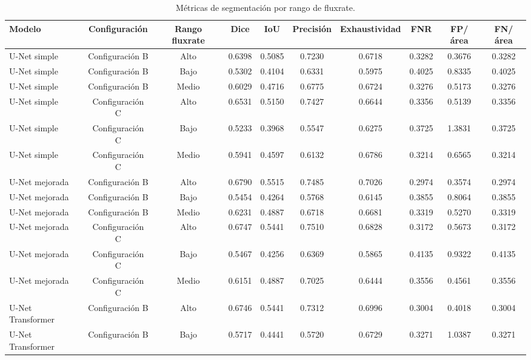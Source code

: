 \begin{table}[H]
    \centering
    \small
    \caption{Métricas de segmentación por rango de fluxrate.}
    \label{tab:metricas_por_rango_fluxrate}
    \begin{tabular}{lccccccccc}
        \toprule
        Modelo & Configuración & Rango fluxrate & Dice & IoU & Precisión & Exhaustividad & FNR & FP/área & FN/área \\
        \midrule
        U-Net simple & Configuración B & Alto & 0.6398 & 0.5085 & 0.7230 & 0.6718 & 0.3282 & 0.3676 & 0.3282 \\
        U-Net simple & Configuración B & Bajo & 0.5302 & 0.4104 & 0.6331 & 0.5975 & 0.4025 & 0.8335 & 0.4025 \\
        U-Net simple & Configuración B & Medio & 0.6029 & 0.4716 & 0.6775 & 0.6724 & 0.3276 & 0.5173 & 0.3276 \\
        U-Net simple & Configuración C & Alto & 0.6531 & 0.5150 & 0.7427 & 0.6644 & 0.3356 & 0.5139 & 0.3356 \\
        U-Net simple & Configuración C & Bajo & 0.5233 & 0.3968 & 0.5547 & 0.6275 & 0.3725 & 1.3831 & 0.3725 \\
        U-Net simple & Configuración C & Medio & 0.5941 & 0.4597 & 0.6132 & 0.6786 & 0.3214 & 0.6565 & 0.3214 \\
        U-Net mejorada & Configuración B & Alto & 0.6790 & 0.5515 & 0.7485 & 0.7026 & 0.2974 & 0.3574 & 0.2974 \\
        U-Net mejorada & Configuración B & Bajo & 0.5454 & 0.4264 & 0.5768 & 0.6145 & 0.3855 & 0.8064 & 0.3855 \\
        U-Net mejorada & Configuración B & Medio & 0.6231 & 0.4887 & 0.6718 & 0.6681 & 0.3319 & 0.5270 & 0.3319 \\
        U-Net mejorada & Configuración C & Alto & 0.6747 & 0.5441 & 0.7510 & 0.6828 & 0.3172 & 0.5673 & 0.3172 \\
        U-Net mejorada & Configuración C & Bajo & 0.5467 & 0.4256 & 0.6369 & 0.5865 & 0.4135 & 0.9322 & 0.4135 \\
        U-Net mejorada & Configuración C & Medio & 0.6151 & 0.4887 & 0.7025 & 0.6444 & 0.3556 & 0.4561 & 0.3556 \\
        U-Net Transformer & Configuración B & Alto & 0.6746 & 0.5441 & 0.7312 & 0.6996 & 0.3004 & 0.4018 & 0.3004 \\
        U-Net Transformer & Configuración B & Bajo & 0.5717 & 0.4441 & 0.5720 & 0.6729 & 0.3271 & 1.0387 & 0.3271 \\

\end{tabular}
\end{table}
